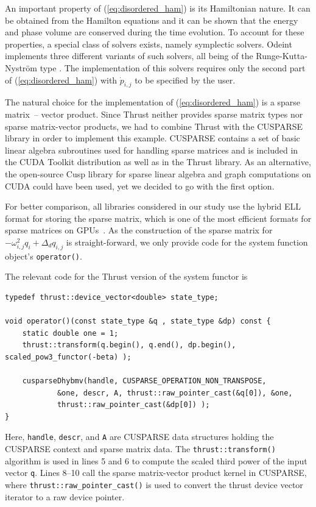 \documentclass[final]{siamltex}
\newcommand{\code}[1]{\lstinline|#1|}
\newcommand{\eqref}[1]{(\ref{#1})}
\begin{document}
An important property of \eqref{eq:disordered_ham} is its Hamiltonian
nature. It can be obtained from the Hamilton equations and it can be
shown that the energy and phase volume are conserved during the time
evolution. To account for these properties, a special class of solvers
exists, namely symplectic solvers. Odeint implements three different
variants of such solvers, all being of the Runge-Kutta-Nystr\"om
type \cite{HairerGeometricNumericalIntegration2006,Leimkuhler-Reich-04}. The implementation of this solvers requires only the second part
of \eqref{eq:disordered_ham} with $\dot{p}_{i,j}$ to be specified by
the user.



The natural choice for the implementation of \eqref{eq:disordered_ham} is a
sparse matrix~-- vector product. Since Thrust neither provides sparse
matrix types nor sparse matrix-vector products, we had to combine
Thrust with the CUSPARSE library in order to implement this example. CUSPARSE    %
contains a set of basic linear algebra subroutines used for handling sparse
matrices and is included in the CUDA Toolkit distribution as well as in the Thrust
library. As an alternative, the open-source Cusp library \cite{CuspRef} for sparse linear algebra
and graph computations on CUDA could have been used, yet we decided to go with the first option.


For better comparison, all libraries considered in our study use the hybrid
ELL format for storing the sparse matrix, which is one of the most efficient
formats for sparse matrices on GPUs~\cite{BellGarland2008}.
As the construction of the sparse matrix for $- \omega_{i,j}^2 q_i + \Delta_d q_{i,j}$ is
straight-forward, we only provide code for the system function object's
\code{operator()}.

The relevant code for the Thrust version of the system functor is
\begin{lstlisting}
typedef thrust::device_vector<double> state_type;

void operator()(const state_type &q , state_type &dp) const {
    static double one = 1;
    thrust::transform(q.begin(), q.end(), dp.begin(), scaled_pow3_functor(-beta) );

    cusparseDhybmv(handle, CUSPARSE_OPERATION_NON_TRANSPOSE,
            &one, descr, A, thrust::raw_pointer_cast(&q[0]), &one,
            thrust::raw_pointer_cast(&dp[0]) );
}
\end{lstlisting}
Here, \code{handle}, \code{descr}, and \code{A} are CUSPARSE data structures
holding the CUSPARSE context and sparse matrix data. The
\code{thrust::transform()} algorithm is used in lines 5 and 6 to compute the scaled
third power of the input vector \code{q}. Lines 8--10 call the sparse matrix-vector product kernel in CUSPARSE,
where \code{thrust::raw_pointer_cast()} is used to convert the thrust device
vector iterator to a raw device pointer.
\end{document}
